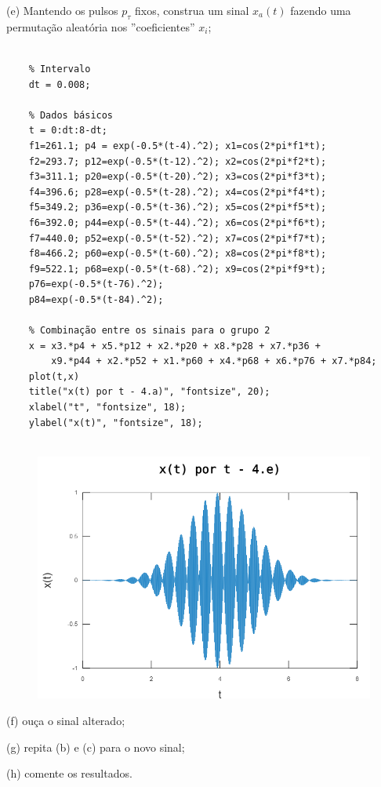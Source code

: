 \documentclass[10pt]{article}
\begin{document}
(e) Mantendo os pulsos $p_{\tau}$ fixos, construa um sinal $x_a(t)$ fazendo uma permutação aleatória nos ''coeficientes'' $x_i$;
\begin{verbatim}
    
    % Intervalo
    dt = 0.008;
    
    % Dados básicos
    t = 0:dt:8-dt;
    f1=261.1; p4 = exp(-0.5*(t-4).^2); x1=cos(2*pi*f1*t);
    f2=293.7; p12=exp(-0.5*(t-12).^2); x2=cos(2*pi*f2*t);
    f3=311.1; p20=exp(-0.5*(t-20).^2); x3=cos(2*pi*f3*t);
    f4=396.6; p28=exp(-0.5*(t-28).^2); x4=cos(2*pi*f4*t);
    f5=349.2; p36=exp(-0.5*(t-36).^2); x5=cos(2*pi*f5*t);
    f6=392.0; p44=exp(-0.5*(t-44).^2); x6=cos(2*pi*f6*t);
    f7=440.0; p52=exp(-0.5*(t-52).^2); x7=cos(2*pi*f7*t);
    f8=466.2; p60=exp(-0.5*(t-60).^2); x8=cos(2*pi*f8*t);
    f9=522.1; p68=exp(-0.5*(t-68).^2); x9=cos(2*pi*f9*t);
    p76=exp(-0.5*(t-76).^2); 
    p84=exp(-0.5*(t-84).^2);
    
    % Combinação entre os sinais para o grupo 2
    x = x3.*p4 + x5.*p12 + x2.*p20 + x8.*p28 + x7.*p36 + 
        x9.*p44 + x2.*p52 + x1.*p60 + x4.*p68 + x6.*p76 + x7.*p84;
    plot(t,x)
    title("x(t) por t - 4.a)", "fontsize", 20);
    xlabel("t", "fontsize", 18);
    ylabel("x(t)", "fontsize", 18);
    
    \end{verbatim}
    \begin{figure}[h]
        \includegraphics[scale=0.6]{questao4e}
        \centering
    \end{figure}
(f) ouça o sinal alterado;

(g) repita (b) e (c) para o novo sinal;

(h) comente os resultados.
\end{document}
